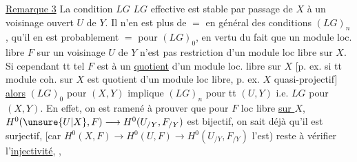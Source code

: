 \uline{Remarque 3} La condition $LG$  $LG$ effective est stable par passage de $X$ à un voisinage ouvert $U$ de $Y$. Il n'en est plus de $=$ en général des conditions $(LG)_n$,  qu'il en est \deleted{\unsure{encore} ainsi de $(LF)_0$, [et d'ailleurs} probablement  $=$ pour $(LG)_0$, en vertu du fait que un module loc. libre $F$ sur un voisinage $U$ de $Y$ n'est pas restriction d'un module loc libre sur  $X$. Si cependant tt tel $F$ est  à un \uline{quotient} d'un module loc. libre sur $X$ [p. ex. si tt module coh. sur $X$ est quotient d'un module loc libre, p. ex. $X$ quasi-projectif] \uline{alors} $(LG)_0$ pour $(X,Y)$ implique $(LG)_n$ pour tt $(U,Y)$ i.e. $LG$ pour $(X,Y)$. En effet, on est ramené à prouver que pour $F$ loc libre \uline{sur $X$}, $H^0(\unsure{U|X},F)\longrightarrow H^0(U_{/Y},F_{/Y})$ est bijectif, on sait déjà qu'il est surjectif, [car $H^0(X,F)\longrightarrow H^0(U,F)\longrightarrow H^0(U_{/Y},F_{/Y})$ l'est) reste à vérifier l'\uline{injectivité}, ,  
